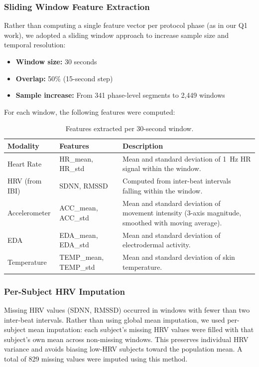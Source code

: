 \documentclass[12pt,letterpaper]{article}
\begin{document}
\subsubsection{Sliding Window Feature Extraction}

Rather than computing a single feature vector per protocol phase (as in our Q1 work), we adopted a sliding window approach to increase sample size and temporal resolution:

\begin{itemize}
    \item \textbf{Window size:} 30 seconds
    \item \textbf{Overlap:} 50\% (15-second step)
    \item \textbf{Sample increase:} From 341 phase-level segments to 2,449 windows
\end{itemize}

For each window, the following features were computed:

\begin{table}[H]
\centering
\caption{Features extracted per 30-second window.}
\label{tab:features-q2}
\begin{tabular}{p{3cm}p{3.5cm}p{7.5cm}}
\toprule
\textbf{Modality} & \textbf{Features} & \textbf{Description} \\
\midrule
Heart Rate & HR\_mean, HR\_std & Mean and standard deviation of 1~Hz HR signal within the window. \\
HRV (from IBI) & SDNN, RMSSD & Computed from inter-beat intervals falling within the window. \\
Accelerometer & ACC\_mean, ACC\_std & Mean and standard deviation of movement intensity (3-axis magnitude, smoothed with moving average). \\
EDA & EDA\_mean, EDA\_std & Mean and standard deviation of electrodermal activity. \\
Temperature & TEMP\_mean, TEMP\_std & Mean and standard deviation of skin temperature. \\
\bottomrule
\end{tabular}
\end{table}

\subsubsection{Per-Subject HRV Imputation}

Missing HRV values (SDNN, RMSSD) occurred in windows with fewer than two inter-beat intervals. Rather than using global mean imputation, we used per-subject mean imputation: each subject's missing HRV values were filled with that subject's own mean across non-missing windows. This preserves individual HRV variance and avoids biasing low-HRV subjects toward the population mean. A total of 829 missing values were imputed using this method.
\end{document}
